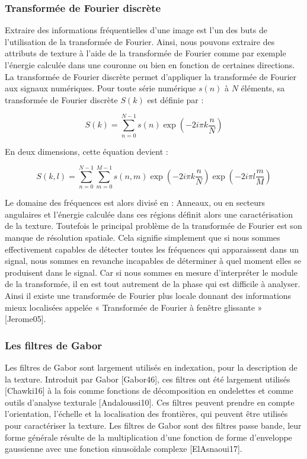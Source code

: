 \subsubsection{Transformée de Fourier discrète}
Extraire des informations fréquentielles d’une image est l’un des buts de l’utilisation de la
transformée de Fourier. Ainsi, nous pouvons extraire des attributs de texture à l’aide de la
transformée de Fourier comme par exemple l’énergie calculée dans une couronne ou bien en
fonction de certaines directions.\\

La transformée de Fourier discrète permet d’appliquer la transformée de Fourier aux signaux
numériques. Pour toute série numérique $s(n)$ à $N$ éléments, sa transformée de Fourier discrète
$S(k)$ est définie par :

\begin{equation}
	S(k) =  \sum_{n=0}^{N-1} s(n) \exp(-2i\pi k\frac{n}{N})
\end{equation}

En deux dimensions, cette équation devient :

\begin{equation}
S(k, l) =  \sum_{n=0}^{N-1} \sum_{m=0}^{M-1} s(n, m) \exp(-2i\pi k\frac{n}{N}) \exp(-2i\pi l\frac{m}{M})
\end{equation}

Le domaine des fréquences est alors divisé en : Anneaux, ou en secteurs angulaires et l’énergie calculée dans ces régions définit alors une caractérisation de la texture. Toutefois le principal problème de la transformée de Fourier est son manque de résolution spatiale. Cela signifie simplement que si nous sommes effectivement capables de détecter toutes les fréquences qui apparaissent dans un signal, nous sommes en revanche incapables de déterminer à quel moment elles se produisent dans le signal. Car si nous sommes en mesure d’interpréter le module de la transformée, il en est tout autrement de la phase qui est difficile à analyser. Ainsi il existe une transformée de Fourier plus locale donnant des informations mieux localisées appelée « Transformée de Fourier à fenêtre glissante » [Jerome05].

\subsubsection{Les filtres de Gabor}

Les filtres de Gabor sont largement utilisés en indexation, pour la description de la texture.
Introduit par Gabor [Gabor46], ces filtres ont été largement utilisés [Chawki16] à la fois comme fonctions de décomposition en ondelettes et comme outils d'analyse texturale [Andaloussi10]. Ces filtres peuvent prendre en compte l'orientation, l'échelle et la localisation des frontières, qui peuvent être utilisés pour caractériser la texture. Les filtres de Gabor sont des filtres passe bande, leur forme générale résulte de la multiplication d’une fonction de forme d'enveloppe gaussienne avec une fonction sinusoïdale complexe [ElAsnaoui17].\\

